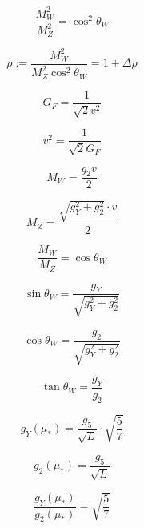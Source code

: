 \documentclass[11pt,a4paper]{article}
\theoremstyle{definition}
\begin{document}
\begin{equation}
\label{eq:add_11}
\frac{M_W^2}{M_Z^2} = \cos^2\theta_W
\end{equation}

\begin{equation}
\label{eq:add_12}
\rho := \frac{M_W^2}{M_Z^2\cos^2\theta_W} = 1 + \Delta\rho
\end{equation}

\begin{equation}
\label{eq:add_13}
G_F = \frac{1}{\sqrt{2}v^2}
\end{equation}

\begin{equation}
\label{eq:add_14}
v^2 = \frac{1}{\sqrt{2}G_F}
\end{equation}

\begin{equation}
\label{eq:add_15}
M_W = \frac{g_2 v}{2}
\end{equation}

\begin{equation}
\label{eq:add_16}
M_Z = \frac{\sqrt{g_Y^2 + g_2^2} \cdot v}{2}
\end{equation}

\begin{equation}
\label{eq:add_17}
\frac{M_W}{M_Z} = \cos\theta_W
\end{equation}

\begin{equation}
\label{eq:add_18}
\sin\theta_W = \frac{g_Y}{\sqrt{g_Y^2 + g_2^2}}
\end{equation}

\begin{equation}
\label{eq:add_19}
\cos\theta_W = \frac{g_2}{\sqrt{g_Y^2 + g_2^2}}
\end{equation}

\begin{equation}
\label{eq:add_20}
\tan\theta_W = \frac{g_Y}{g_2}
\end{equation}

\begin{equation}
\label{eq:add_21}
g_Y(\mu_*) = \frac{g_5}{\sqrt{L}}\cdot\sqrt{\frac{5}{7}}
\end{equation}

\begin{equation}
\label{eq:add_22}
g_2(\mu_*) = \frac{g_5}{\sqrt{L}}
\end{equation}

\begin{equation}
\label{eq:add_23}
\frac{g_Y(\mu_*)}{g_2(\mu_*)} = \sqrt{\frac{5}{7}}
\end{equation}
\end{document}
